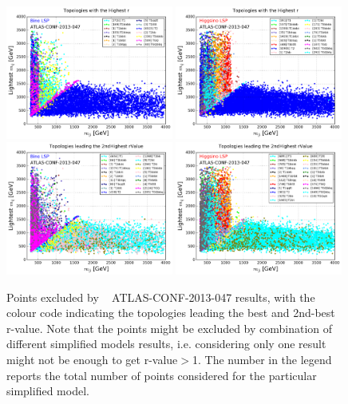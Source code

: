 \documentclass[a4paper,11pt]{article}
\begin{document}
\begin{figure}[!b]
	\centering
	\subfigure
	{ \includegraphics[width=0.49\textwidth]{Fig/FastLim/BinoTxNames_Scatter_Best_All_LightS_All.png}}
	\subfigure
	{\includegraphics[width=0.49\textwidth]{Fig/FastLim/HiggsinoTxNames_Scatter_Best_All_LightS_All.png}}
	\subfigure
	{ \includegraphics[width=0.49\textwidth]{Fig/FastLim/BinoTxNames_Scatter_2ndBest_All_LightS_All.png}}
	\subfigure
	{\includegraphics[width=0.49\textwidth]{Fig/FastLim/HiggsinoTxNames_Scatter_2ndBest_All_LightS_All.png}}
	\caption{Points excluded by \FastLim~ ATLAS-CONF-2013-047 results, with the colour code indicating the topologies leading the best and 2nd-best r-value. Note that the points might be excluded by combination of different simplified models results, i.e. considering only one result might not be enough to get r-value$>$1. The number in the legend reports the total number of points considered for the particular simplified model. }
	\label{fastlim}
	
	
\end{figure}
\end{document}
